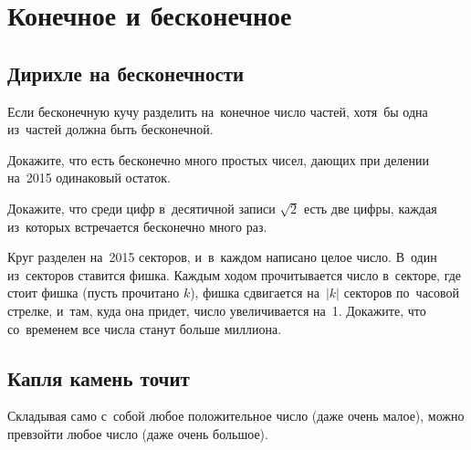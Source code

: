 
\section*{Конечное и бесконечное}



\subsection*{Дирихле на бесконечности}

Если бесконечную кучу разделить на~конечное число частей, хотя~бы одна
из~частей должна быть бесконечной.

\begin{problems}

\item
Докажите, что есть бесконечно много простых чисел, дающих при делении на~2015
одинаковый остаток.

\item
Докажите, что среди цифр в~десятичной записи $\sqrt{2}$ есть две цифры, каждая
из~которых встречается бесконечно много раз.

\item
Круг разделен на~2015 секторов, и~в~каждом написано целое число.
В~один из~секторов ставится фишка.
Каждым ходом прочитывается число в~секторе, где стоит фишка
(пусть прочитано $k$), фишка сдвигается на~$\lvert k \rvert$ секторов по~часовой стрелке,
и~там, куда она придет, число увеличивается на~1.
Докажите, что со~временем все числа станут больше миллиона.

\end{problems}

\subsection*{Капля камень точит}

Складывая само с~собой любое положительное число (даже очень малое), можно
превзойти любое число (даже очень большое).

